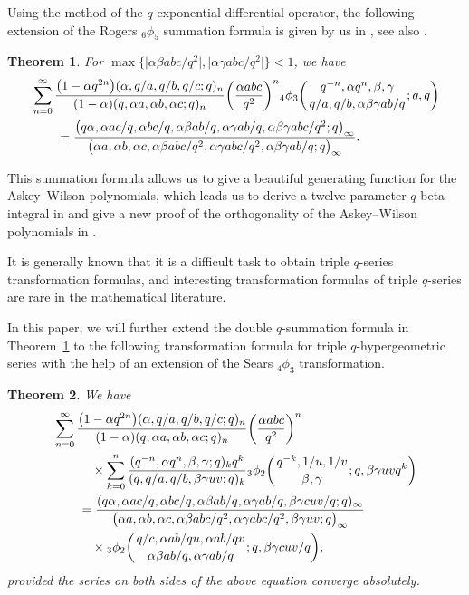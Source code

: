 \documentclass[10pt,a4paper]{amsart}
\numberwithin{equation}{section}
\newtheorem{Theorem}{Theorem}[section]
\begin{document}
Using the method of the $q$-exponential differential operator,
the following extension of the Rogers $_6\phi_5$ summation formula is given by us in \cite[Theorem~3]{Liu2011}, see also \cite[Theorem~6.2]{LiuRam2013}.
\begin{Theorem}\label{rogersliuthm}
	For $\max\bigl\{\bigl|\alpha \beta abc/q^2\bigr|, \bigl|\alpha \gamma abc/q^2\bigr|\bigr\}<1$, we have
	\begin{align*}
		&\sum_{n=0}^\infty \frac{\bigl(1-\alpha q^{2n}\bigr)(\alpha, q/a, q/b, q/c; q)_n}{(1-\alpha)(q, \alpha a, \alpha b, \alpha c; q)_n}
		\biggl(\frac{\alpha abc}{q^2}\biggr)^n {_4 \phi_3} \biggl({{q^{-n}, \alpha q^n, \beta, \gamma}
			\atop{q/a, q/b,\alpha \beta \gamma ab/q}}; q, q\biggr)\\
		&\qquad{}=\frac{\bigl(q\alpha, \alpha ac/q, \alpha bc/q, \alpha \beta ab/q, \alpha \gamma ab/q, \alpha \beta \gamma abc/q^2; q\bigr)_\infty}
		{\bigl(\alpha a, \alpha b, \alpha c, \alpha \beta abc/q^2, \alpha \gamma abc/q^2, \alpha \beta \gamma ab/q; q\bigr)_\infty}.
	\end{align*}
\end{Theorem}
 This summation formula allows us to give a beautiful generating function for the Askey--Wilson polynomials, which leads us
 to derive a twelve-parameter $q$-beta integral in \cite{Liu2019} and give a new proof of the orthogonality of the Askey--Wilson polynomials in \cite{Liu2021}.

It is generally known that it is a difficult task to obtain triple $q$-series transformation formulas, and interesting transformation formulas of triple $q$-series are rare in the mathematical literature.

In this paper, we will further extend the double $q$-summation formula in Theorem~\ref{rogersliuthm} to
the following transformation formula for triple $q$-hypergeometric series with the help of an extension of the Sears $_4\phi_3$ transformation.

\begin{Theorem}\label{liuthma} We have
	\begin{align*}
		&\sum_{n=0}^\infty \frac{\bigl(1-\alpha q^{2n}\bigr)(\alpha, q/a, q/b, q/c; q)_n}{(1-\alpha)(q, \alpha a, \alpha b, \alpha c; q)_n}
		\biggl(\frac{\alpha abc}{q^2}\biggr)^n \\
		&\qquad\quad{} \times \sum_{k=0}^{n} \frac{(q^{-n}, \alpha q^n, \beta, \gamma; q)_k q^k}
		{(q, q/a, q/b, \beta \gamma uv; q)_k}
		{_3\phi_2 \biggl({{q^{-k}, 1/u, 1/v}\atop{\beta, \gamma}}; q, \beta \gamma uv q^k\biggr)}\\
		&\qquad{}=\frac{(q\alpha, \alpha ac/q, \alpha bc/q, \alpha \beta ab/q, \alpha \gamma ab/q, \beta \gamma cuv/q; q )_\infty}{\bigl(\alpha a, \alpha b, \alpha c, \alpha \beta abc/q^2, \alpha \gamma abc/q^2, \beta \gamma uv; q \bigr)_\infty}\\
		&\qquad\quad{} \times{_3\phi_2} \biggl({{q/c, \alpha ab/qu, \alpha ab/qv}\atop{\alpha \beta ab/q, \alpha \gamma ab/q}}; q,
		\beta \gamma cuv/q \biggr),
	\end{align*}
	provided the series on both sides of the above equation converge absolutely.
\end{Theorem}
\end{document}
